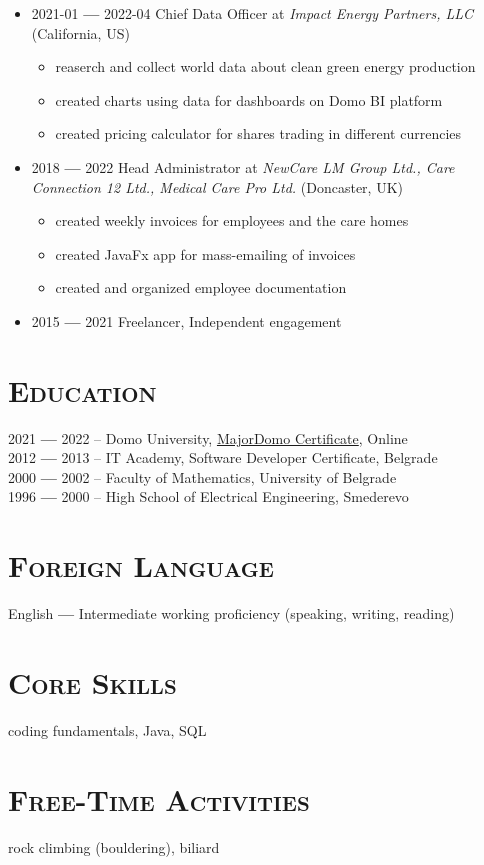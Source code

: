 \documentclass[12pt]{article}
\begin{document}
\begin{itemize}

    \item  2021-01 \textbf{---} 2022-04 Chief Data Officer at \textit{Impact Energy Partners, LLC} (California, US)
        \begin{itemize}
            \setlength\itemsep{-0.3em}
            \item reaserch and collect world data about clean green energy production
            \item created charts using data for dashboards on Domo BI platform
            \item created pricing calculator for shares trading in different currencies
        \end{itemize}
    \item  2018    \textbf{---} 2022    Head Administrator at \textit{NewCare LM Group Ltd., Care Connection 12 Ltd., Medical Care Pro Ltd.} (Doncaster, UK)
        \begin{itemize}
            \setlength\itemsep{-0.3em}
            \item created weekly invoices for employees and the care homes
            \item created JavaFx app for mass-emailing of invoices
            \item created and organized employee documentation 
        \end{itemize}
    \item  2015    \textbf{---} 2021 Freelancer, Independent engagement    
\end{itemize}

\section{\textsc{Education}}

    2021 \textbf{---} 2022 -- Domo University, \href{https://drive.google.com/file/d/1i-GzyE43WospitxXdFWp2bRYe6wqZG48/view?usp=sharing}{MajorDomo Certificate}, Online \\
    2012 \textbf{---} 2013 -- IT Academy, Software Developer Certificate, Belgrade \\
    2000 \textbf{---} 2002 -- Faculty of Mathematics, University of Belgrade \\
    1996 \textbf{---} 2000 -- High School of Electrical Engineering, Smederevo

\section{\textsc{Foreign Language}} 

    English \textbf{---} Intermediate working proficiency (speaking, writing, reading)

\section{\textsc{Core Skills}}
 
    coding fundamentals, Java, SQL

\section{\textsc{Free-Time Activities}}

    rock climbing (bouldering), biliard
\end{document}
